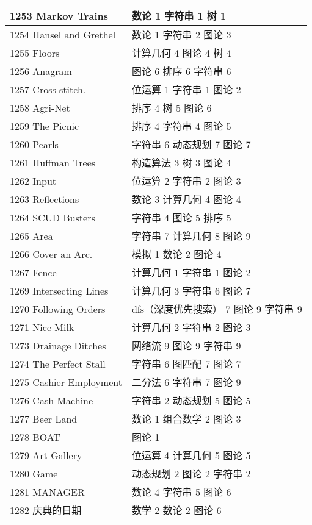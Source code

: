 \begin{longtable}{| p{} | p{} |}
 1253 Markov Trains  & 数论 1 字符串 1 树 1 \\ \hline
 1254 Hansel and Grethel  & 数论 1 字符串 2 图论 3 \\ \hline
 1255 Floors  & 计算几何 4 图论 4 树 4 \\ \hline
 1256 Anagram  & 图论 6 排序 6 字符串 6 \\ \hline
 1257 Cross-stitch.  & 位运算 1 字符串 1 图论 2 \\ \hline
 1258 Agri-Net  & 排序 4 树 5 图论 6 \\ \hline
 1259 The Picnic  & 排序 4 字符串 4 图论 5 \\ \hline
 1260 Pearls  & 字符串 6 动态规划 7 图论 7 \\ \hline
 1261 Huffman Trees  & 构造算法 3 树 3 图论 4 \\ \hline
 1262 Input  & 位运算 2 字符串 2 图论 3 \\ \hline
 1263 Reflections  & 数论 3 计算几何 4 图论 4 \\ \hline
 1264 SCUD Busters  & 字符串 4 图论 5 排序 5 \\ \hline
 1265 Area  & 字符串 7 计算几何 8 图论 9 \\ \hline
 1266 Cover an Arc.  & 模拟 1 数论 2 图论 4 \\ \hline
 1267 Fence  & 计算几何 1 字符串 1 图论 2 \\ \hline
 1269 Intersecting Lines  & 计算几何 3 字符串 6 图论 7 \\ \hline
 1270 Following Orders  & dfs（深度优先搜索） 7 图论 9 字符串 9 \\ \hline
 1271 Nice Milk  & 计算几何 2 字符串 2 图论 3 \\ \hline
 1273 Drainage Ditches  & 网络流 9 图论 9 字符串 9 \\ \hline
 1274 The Perfect Stall  & 字符串 6 图匹配 7 图论 7 \\ \hline
 1275 Cashier Employment  & 二分法 6 字符串 7 图论 9 \\ \hline
 1276 Cash Machine  & 字符串 2 动态规划 5 图论 5 \\ \hline
 1277 Beer Land  & 数论 1 组合数学 2 图论 3 \\ \hline
 1278 BOAT  & 图论 1 \\ \hline
 1279 Art Gallery  & 位运算 4 计算几何 5 图论 5 \\ \hline
 1280 Game  & 动态规划 2 图论 2 字符串 2 \\ \hline
 1281 MANAGER  & 数论 4 字符串 5 图论 6 \\ \hline
 1282 庆典的日期  & 数学 2 数论 2 图论 6 \\ \hline

\end{longtable}
